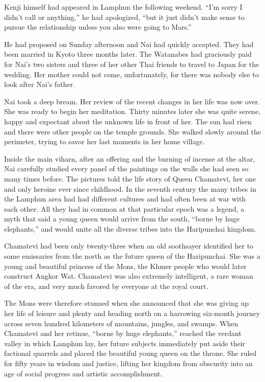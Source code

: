 \documentclass[]{article}
\begin{document}
{Kenji himself had appeared in Lamphun the following weekend.  “I’m sorry I didn’t call or anything,” he had apologized, “but it just didn’t make sense to pursue the relationship unless you also were going to Mars.”

He had proposed on Sunday afternoon and Nai had quickly accepted.  They had been married in Kyoto three months later.  The Watanabes had graciously paid for Nai’s two sisters and three of her other Thai friends to travel to Japan for the wedding.  Her mother could not come, unfortunately, for there was nobody else to look after Nai’s father.

Nai took a deep bream.  Her review of the recent changes in her life was now over.  She was ready to begin her meditation.  Thirty minutes later she was quite serene, happy and expectant about the unknown life in front of her.  The sun had risen and there were other people on the temple grounds.  She walked slowly around the perimeter, trying to savor her last moments in her home village.

Inside the main viharn, after an offering and the burning of incense at the altar, Nai carefully studied every panel of the paintings on the walls she had seen so many times before.  The pictures told the life story of Queen Chamatevi, her one and only heroine ever since childhood.  In the seventh century the many tribes in the Lamphun area had had different cultures and had often been at war with each other.  All they had in common at that particular epoch was a legend, a myth that said a young queen would arrive from the south, “borne by huge elephants,” and would unite all the diverse tribes into the Haripunchai kingdom.

Chamatevi had been only twenty-three when an old soothsayer identified her to some emissaries from the north as the future queen of the Haripunchai.  She was a young and beautiful princess of the Mons, the Khmer people who would later construct Angkor Wat.  Chamatevi was also extremely intelligent, a rare woman of the era, and very much favored by everyone at the royal court.

The Mons were therefore stunned when she announced that she was giving up her life of leisure and plenty and heading north on a harrowing six-month journey across seven hundred kilometers of mountains, jungles, and swamps.  When Chamatevi and her retinue, “borne by huge elephants,” reached the verdant valley in which Lamphun lay, her future subjects immediately put aside their factional quarrels and placed the beautiful young queen on the throne.  She ruled for fifty years in wisdom and justice, lifting her kingdom from obscurity into an age of social progress and artistic accomplishment.

}
\end{document}
